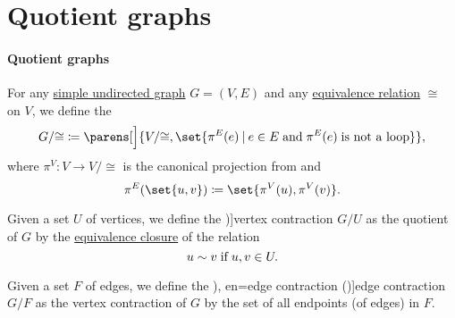 \section{Quotient graphs}\label{sec:quotient_graphs}

\paragraph{Quotient graphs}

\begin{definition}\label{def:quotient_graph}\mimprovised
  For any \hyperref[def:undirected_graph]{simple undirected graph} \( G = (V, E) \) and any \hyperref[def:equivalence_relation]{equivalence relation} \( {\cong} \) on \( V \), we define the 
  \begin{equation*}
    G / {\cong} \coloneqq \parens[\Big]{ V / {\cong}, \set{ \pi^E(e) \given e \in E \T{and} \pi^E(e) \T{is not a loop} } },
  \end{equation*}
  where \( \pi^V: V \to V / {\cong} \) is the canonical projection from  and
  \begin{equation*}
    \pi^E(\set{ u, v }) \coloneqq \set{ \pi^V(u), \pi^V(v) }.
  \end{equation*}

  \begin{thmenum}
     Given a set \( U \) of vertices, we define the \term[ru=отождествление вершин (\cite[22]{ЕмеличевИПр1990Графы})]{vertex contraction} \( G / U \) as the quotient of \( G \) by the \hyperref[thm:equivalence_closure]{equivalence closure} of the relation
    \begin{equation*}
      u \sim v \T{if} u, v \in U.
    \end{equation*}

     Given a set \( F \) of edges, we define the \term[ru=стягивание ребра (\cite[21]{ЕмеличевИПр1990Графы}), en=edge contraction (\cite[697]{Rosen2019DiscreteMathematics})]{edge contraction} \( G / F \) as the vertex contraction of \( G \) by the set of all endpoints (of edges) in \( F \).
  \end{thmenum}
\end{definition}
